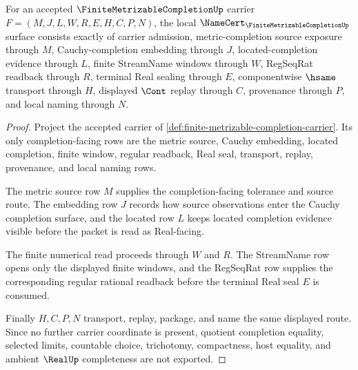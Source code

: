 \begin{theorem}
\label{thm:finite-metrizable-completion-namecert-obligations}
For an accepted $\FiniteMetrizableCompletionUp$ carrier $F=(M,J,L,W,R,E,H,C,P,N)$, the local $\NameCert_{\FiniteMetrizableCompletionUp}$ surface consists exactly of carrier admission, metric-completion source exposure through $M$, Cauchy-completion embedding through $J$, located-completion evidence through $L$, finite StreamName windows through $W$, RegSeqRat readback through $R$, terminal Real sealing through $E$, componentwise $\hsame$ transport through $H$, displayed $\Cont$ replay through $C$, provenance through $P$, and local naming through $N$.
\end{theorem}
\begin{proof}
Project the accepted carrier of \autoref{def:finite-metrizable-completion-carrier}. Its only completion-facing rows are the metric source, Cauchy embedding, located completion, finite window, regular readback, Real seal, transport, replay, provenance, and local naming rows.

The metric source row $M$ supplies the completion-facing tolerance and source route. The embedding row $J$ records how source observations enter the Cauchy completion surface, and the located row $L$ keeps located completion evidence visible before the packet is read as Real-facing.

The finite numerical read proceeds through $W$ and $R$. The StreamName row opens only the displayed finite windows, and the RegSeqRat row supplies the corresponding regular rational readback before the terminal Real seal $E$ is consumed.

Finally $H,C,P,N$ transport, replay, package, and name the same displayed route. Since no further carrier coordinate is present, quotient completion equality, selected limits, countable choice, trichotomy, compactness, host equality, and ambient $\RealUp$ completeness are not exported.
\end{proof}

